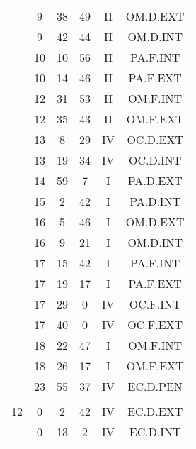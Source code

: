 \documentclass[12pt, a4paper]{article}
\begin{document}
\begin{multicols}{3}
{\begin{tabular}{c c c c c c}
	 	 	 	 & 9 & 38 & 49 & II & OM.D.EXT\\%
	 	 	 	 & 9 & 42 & 44 & II & OM.D.INT\\%
	 	 	 	 & 10 & 10 & 56 & II & PA.F.INT\\%
	 	 	 	 & 10 & 14 & 46 & II & PA.F.EXT\\%
	 	 	 	 & 12 & 31 & 53 & II & OM.F.INT\\%
	 	 	 	 & 12 & 35 & 43 & II & OM.F.EXT\\%
	 	 	 	 & 13 & 8 & 29 & IV & OC.D.EXT\\%
	 	 	 	 & 13 & 19 & 34 & IV & OC.D.INT\\%
	 	 	 	 & 14 & 59 & 7 & I & PA.D.EXT\\%
	 	 	 	 & 15 & 2 & 42 & I & PA.D.INT\\%
	 	 	 	 & 16 & 5 & 46 & I & OM.D.EXT\\%
	 	 	 	 & 16 & 9 & 21 & I & OM.D.INT\\%
	 	 	 	 & 17 & 15 & 42 & I & PA.F.INT\\%
	 	 	 	 & 17 & 19 & 17 & I & PA.F.EXT\\%
	 	 	 	 & 17 & 29 & 0 & IV & OC.F.INT\\%
	 	 	 	 & 17 & 40 & 0 & IV & OC.F.EXT\\%
	 	 	 	 & 18 & 22 & 47 & I & OM.F.INT\\%
	 	 	 	 & 18 & 26 & 17 & I & OM.F.EXT\\%
	 	 	 	 & 23 & 55 & 37 & IV & EC.D.PEN\\%
	 	 	 	 & & & & & \\%
	 	 	 	12 & 0 & 2 & 42 & IV & EC.D.EXT\\%
	 	 	 	 & 0 & 13 & 2 & IV & EC.D.INT\\%
	 	 \end{tabular}
 	}
\end{multicols}
\end{document}
